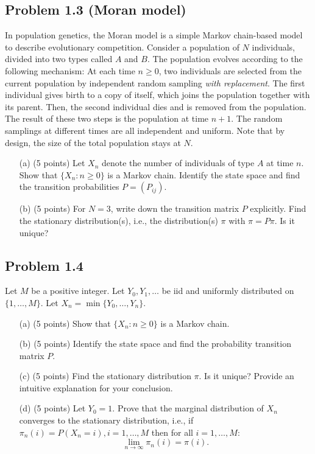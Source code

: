 \documentclass{article}
\begin{document}
\subsection*{Problem 1.3 (Moran model)} 
In population genetics, the
Moran model is a simple Markov chain-based model to describe
evolutionary competition. Consider a population of $N$ individuals,
divided into two types called $A$ and $B$. The population evolves
according to the following mechanism: At each time $n \geq 0$, two
individuals are selected from the current population by independent
random sampling \textit{with replacement}. The first individual gives
birth to a copy of itself, which joins the population together with
its parent. Then, the second individual dies and is removed from the
population. The result of these two steps is the population at time
$n + 1$. The random samplings at different times are all independent
and uniform. Note that by design, the size of the total population
stays at $N$.

\begin{enumerate}
    \item[(a)] (5 points) Let $X_n$ denote the number of individuals of type $A$ at time $n$. Show that $\{X_n : n \geq 0\}$ is a Markov chain. Identify the state space and find the transition probabilities $P = (P_{ij})$.
    \item[(b)] (5 points) For $N = 3$, write down the transition matrix $P$ explicitly. Find the stationary distribution(s), i.e., the distribution(s) $\pi$ with $\pi = P \pi$. Is it unique?
\end{enumerate}

\subsection*{Problem 1.4}
Let $M$ be a positive integer. Let $Y_0, Y_1, \ldots$ be iid and uniformly distributed on $\{1, \ldots, M\}$. Let $X_n = \min\{Y_0, \ldots, Y_n\}$.

\begin{enumerate}
    \item[(a)] (5 points) Show that $\{X_n : n \geq 0\}$ is a Markov chain.
    \item[(b)] (5 points) Identify the state space and find the probability transition matrix $P$.
    \item[(c)] (5 points) Find the stationary distribution $\pi$. Is it unique? Provide an intuitive explanation for your conclusion.
    \item[(d)] (5 points) Let $Y_0 = 1$. Prove that the marginal distribution of $X_n$ converges to the stationary distribution, i.e., if $\pi_n(i) = P(X_n = i), i = 1, \ldots, M$ then for all $i = 1, \ldots, M$:
    \[
    \lim_{n \to \infty} \pi_n(i) = \pi(i).
    \]
\end{enumerate}
\end{document}
